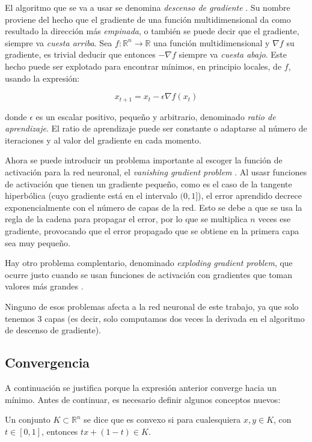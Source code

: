 El algoritmo que se va a usar se denomina \textit{descenso de gradiente} \cite{lemarechal2012cauchy}.
Su nombre proviene del hecho
que el gradiente de una función multidimensional da como resultado la dirección más \textit{empinada},
o también se puede decir que el gradiente, siempre va \textit{cuesta arriba}. Sea $f \colon \mathbb{R}^n \longrightarrow \mathbb{R}$
una función multidimensional y $\nabla f$ su gradiente, es trivial deducir que entonces $-\nabla f$
siempre va \textit{cuesta abajo}. Este hecho puede ser explotado para encontrar mínimos, en principio locales,
de $f$, usando la expresión:

\begin{equation}
    \label{eqn:gradient_descent}
    x_{t+1}=x_t-\epsilon\nabla f(x_t)
\end{equation}

donde $\epsilon$ es un escalar positivo, pequeño y arbitrario, denominado \textit{ratio de aprendizaje}.
El ratio de aprendizaje puede ser constante o adaptarse al número de iteraciones y al valor del gradiente en cada momento.

Ahora se puede introducir un problema importante al escoger la función de activación para la red neuronal, el \textit{vanishing gradient problem} \cite{hochreiter1991untersuchungen}.
Al usasr funciones de activación que tienen un gradiente pequeño, como es el caso de la tangente hiperbólica (cuyo gradiente está en el intervalo $(0,1]$), el error aprendido decrece exponencialmente
con el número de capas de la red. Esto se debe a que se usa la regla de la cadena para propagar el error, por lo que se multiplica $n$ veces ese gradiente, provocando que el error propagado que se obtiene
en la primera capa sea muy pequeño.

Hay otro problema complentario, denominado \textit{exploding gradient problem}, que ocurre justo cuando se usan funciones de activación con gradientes que toman valores más grandes \cite{philipp2017exploding}.

Ninguno de esos problemas afecta a la red neuronal de este trabajo, ya que solo tenemos 3 capas (es decir, solo computamos dos veces la derivada en el algoritmo de descenso de gradiente).

\subsection*{Convergencia}

A continuación se justifica porque la expresión anterior converge hacia un mínimo. Antes de continuar, es necesario definir algunos
conceptos nuevos:
\begin{definition}
    Un conjunto $K\subset \mathbb{R}^n$ se dice que es convexo si para cualesquiera $x,y\in K$, con $t\in[0,1]$, entonces $tx+(1-t)\in K$.
\end{definition}

